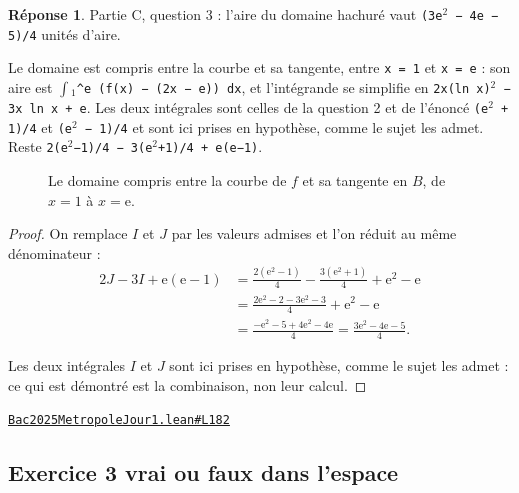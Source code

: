 \documentclass[11pt,a4paper]{article}
\theoremstyle{definition}
\theoremstyle{plain}
\theoremstyle{definition}
\newtheorem*{reponse}{Réponse}
\newcommand{\source}[2]{\par\smallskip\noindent\hfill{\footnotesize\href{#1}{\texttt{#2}}}\par\smallskip}
\begin{document}
\begin{reponse}
Partie C, question 3 : l'aire du domaine hachuré vaut \texttt{(3e\(^{2}\) − 4e − 5)/4} unités
d'aire.

Le domaine est compris entre la courbe et sa tangente, entre \texttt{x = 1} et \texttt{x = e} :
son aire est \texttt{\(\int\)\(_{1}\)\textasciicircum{}e (f(x) − (2x − e)) dx}, et l'intégrande se simplifie en
\texttt{2x(ln x)\(^{2}\) − 3x ln x + e}. Les deux intégrales sont celles de la question 2 et de
l'énoncé \textemdash{} \texttt{(e\(^{2}\) + 1)/4} et \texttt{(e\(^{2}\) − 1)/4} \textemdash{} et sont ici prises en hypothèse, comme le
sujet les admet. Reste \texttt{2(e\(^{2}\)−1)/4 − 3(e\(^{2}\)+1)/4 + e(e−1)}.
\end{reponse}

\begin{figure}[h]
\centering

\caption{Le domaine compris entre la courbe de \(f\) et sa tangente en \(B\), de \(x = 1\) à \(x = \mathrm{e}\).}
\end{figure}
\begin{proof}
On remplace $I$ et $J$ par les valeurs admises et l'on réduit au même dénominateur :
\[
\begin{aligned}
2J - 3I + \mathrm{e}(\mathrm{e} - 1)
 &= \frac{2(\mathrm{e}^2 - 1)}{4} - \frac{3(\mathrm{e}^2 + 1)}{4}
    + \mathrm{e}^2 - \mathrm{e} \\
 &= \frac{2\mathrm{e}^2 - 2 - 3\mathrm{e}^2 - 3}{4} + \mathrm{e}^2 - \mathrm{e} \\
 &= \frac{-\mathrm{e}^2 - 5 + 4\mathrm{e}^2 - 4\mathrm{e}}{4}
  = \frac{3\mathrm{e}^2 - 4\mathrm{e} - 5}{4} .
\end{aligned}
\]

Les deux intégrales $I$ et $J$ sont ici prises en hypothèse, comme le sujet les admet :
ce qui est démontré est la combinaison, non leur calcul.
\end{proof}
\source{https://github.com/Commutator-IO/learn-lean/blob/main/exams/2025/Bac2025MetropoleJour1.lean\#L182}{Bac2025MetropoleJour1.lean\#L182}

\subsection{Exercice 3 \textemdash{} vrai ou faux dans l'espace}
\end{document}
